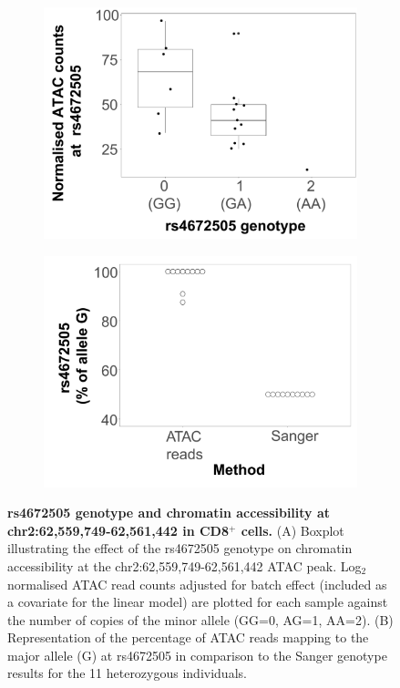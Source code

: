 \begin{figure}[htbp]
\centering
\begin{subfigure}{0.45\textwidth}
\centering
\includegraphics[width=\textwidth]{./Results2/pdfs/ATAC_caQTL_CD8_final}
\caption{\textbf{}}
\end{subfigure}%
\begin{subfigure}{0.45\textwidth}
\centering
\includegraphics[width=\textwidth]{./Results2/pdfs/chr2p15_rs4672505_allelic_imbalance_CD8_final}
\caption{\textbf{}}
\end{subfigure}
\caption[rs4672505 genotype and chromatin accessibility at chr2:62,559,749-62,561,442 in CD8$^+$ cells.]{\textbf{rs4672505 genotype and chromatin accessibility at chr2:62,559,749-62,561,442 in CD8$^+$ cells.} (A) Boxplot illustrating the effect of the rs4672505 genotype on chromatin accessibility at the chr2:62,559,749-62,561,442 ATAC peak. Log$_2$ normalised ATAC read counts adjusted for batch effect (included as a covariate for the linear model) are plotted for each sample against the number of copies of the minor allele (GG=0, AG=1, AA=2). (B) Representation of the percentage of ATAC reads mapping to the major allele (G) at rs4672505 in comparison to the Sanger genotype results for the 11 heterozygous individuals.}
\label{figure:ATAC_PS_CTL_caQTL_and_allelic_imbalance}
\end{figure} 
 
